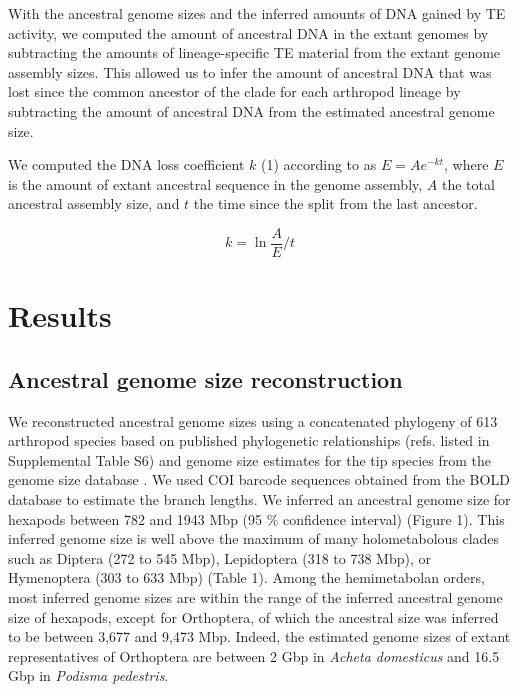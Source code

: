 With the ancestral genome sizes and the inferred amounts of DNA gained
by TE activity, we computed the amount of ancestral DNA in the extant
genomes by subtracting the amounts of lineage-specific TE material from
the extant genome assembly sizes. This allowed us to infer the amount of
ancestral DNA that was lost since the common ancestor of the clade for
each arthropod lineage by subtracting the amount of ancestral DNA from
the estimated ancestral genome size.

We computed the DNA loss coefficient \(k\) (1) according to
\citet{Lindblad-Toh2005} as \(E = A e^{-kt}\), where \(E\) is
the amount of extant ancestral sequence in the genome assembly,
\(A\) the total ancestral assembly size, and
\(t\) the time since the split from the last ancestor.

\[k = \ln{\frac{A}{E}}/t\]

\section{Results}\label{results}

\subsection{Ancestral genome size
reconstruction}\label{ancestral-genome-size-reconstruction}

We reconstructed ancestral genome sizes using a concatenated phylogeny
of 613 arthropod species based on published phylogenetic relationships
(refs. listed in Supplemental Table S6) and genome size estimates for
the tip species from the genome size database \citep{Gregory2018}. We
used COI barcode sequences obtained from the BOLD database
\citep{Ratnasingham2007} to estimate the branch lengths. We inferred an
ancestral genome size for hexapods between 782 and 1943 Mbp (95 \%
confidence interval) (Figure 1). This inferred genome size is well above
the maximum of many holometabolous clades such as Diptera (272 to 545
Mbp), Lepidoptera (318 to 738 Mbp), or Hymenoptera (303 to 633 Mbp)
(Table 1). Among the hemimetabolan orders, most inferred genome sizes
are within the range of the inferred ancestral genome size of hexapods,
except for Orthoptera, of which the ancestral size was inferred to be
between 3,677 and 9,473 Mbp. Indeed, the estimated genome sizes of
extant representatives of Orthoptera are between 2 Gbp in \emph{Acheta
domesticus} and 16.5 Gbp in \emph{Podisma pedestris}.

